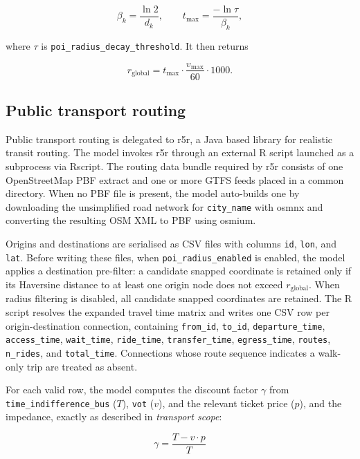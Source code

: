 \documentclass{article}
\begin{document}
\begin{equation}
    \beta_k = \frac{\ln 2}{d_k},
    \qquad
    t_{\max} = \frac{-\ln \tau}{\beta_k},
\end{equation}

\noindent where \(\tau\) is
\texttt{poi\_radius\_decay\_threshold}. It then returns

\begin{equation}
    r_{\text{global}}
    =
    t_{\max}\cdot\frac{v_{\max}}{60}\cdot 1000.
\end{equation}
\subsection{Public transport routing}
Public transport routing is delegated to r5r, a Java based library
for realistic transit routing. The model invokes r5r through an
external R script launched as a subprocess via Rscript. The routing
data bundle required by r5r consists of one OpenStreetMap PBF extract
and one or more GTFS feeds placed in a common directory. When no PBF file is
present, the model auto-builds one by downloading the unsimplified road network
for \texttt{city\_name} with osmnx and converting the resulting OSM
XML to PBF using osmium.

Origins and destinations are serialised as CSV files with columns
\texttt{id}, \texttt{lon}, and \texttt{lat}. Before writing these files, when \texttt{poi\_radius\_enabled} is enabled,
the model applies a destination pre-filter: a candidate snapped coordinate is
retained only if its Haversine distance to at least one origin node does not
exceed \(r_{\text{global}}\). When radius filtering is disabled, all candidate
snapped coordinates are retained.
The R script resolves the expanded travel time
matrix and writes one CSV row per origin-destination connection, containing
\texttt{from\_id}, \texttt{to\_id}, \texttt{departure\_time},
\texttt{access\_time}, \texttt{wait\_time}, \texttt{ride\_time},
\texttt{transfer\_time}, \texttt{egress\_time}, \texttt{routes},
\texttt{n\_rides}, and \texttt{total\_time}. Connections whose route sequence
indicates a walk-only trip are treated as absent.

For each valid row, the model computes the discount factor \(\gamma\) from
\texttt{time\_indifference\_bus} (\(T\)), \texttt{vot} (\(v\)), and the
relevant ticket price (\(p\)), and the impedance, exactly as described in
\emph{transport scope}:

\begin{equation}
    \gamma = \frac{T - v \cdot p}{T}
\end{equation}
\end{document}
